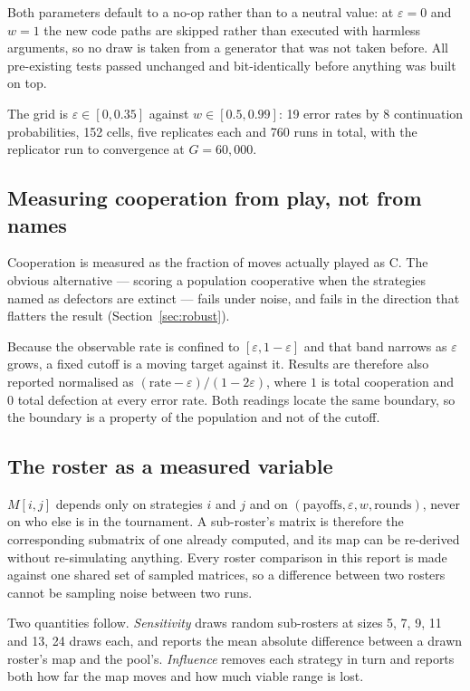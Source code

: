 \documentclass[11pt,a4paper]{article}
\newcommand{\eps}{\varepsilon}
\begin{document}
Both parameters default to a no-op rather than to a neutral value: at $\eps = 0$
and $w = 1$ the new code paths are skipped rather than executed with harmless
arguments, so no draw is taken from a generator that was not taken before. All
pre-existing tests passed unchanged and bit-identically before anything was
built on top.

The grid is $\eps \in [0, 0.35]$ against $w \in [0.5, 0.99]$: 19 error rates by
8 continuation probabilities, 152 cells, five replicates each and 760 runs in
total, with the replicator run to convergence at $G = 60{,}000$.

\subsection{Measuring cooperation from play, not from names}
\label{sec:metric}

Cooperation is measured as the fraction of moves actually played as \textsf{C}.
The obvious alternative --- scoring a population cooperative when the strategies
named as defectors are extinct --- fails under noise, and fails in the direction
that flatters the result (Section~\ref{sec:robust}).

Because the observable rate is confined to $[\eps, 1-\eps]$ and that band
narrows as $\eps$ grows, a fixed cutoff is a moving target against it. Results
are therefore also reported normalised as $(\text{rate}-\eps)/(1-2\eps)$, where
$1$ is total cooperation and $0$ total defection at every error rate. Both
readings locate the same boundary, so the boundary is a property of the
population and not of the cutoff.

\subsection{The roster as a measured variable}
\label{sec:roster-method}

$M[i,j]$ depends only on strategies $i$ and $j$ and on
$(\text{payoffs}, \eps, w, \text{rounds})$, never on who else is in the
tournament. A sub-roster's matrix is therefore the corresponding submatrix of
one already computed, and its map can be re-derived without re-simulating
anything. Every roster comparison in this report is made against one shared set
of sampled matrices, so a difference between two rosters cannot be sampling
noise between two runs.

Two quantities follow. \emph{Sensitivity} draws random sub-rosters at sizes 5,
7, 9, 11 and 13, 24 draws each, and reports the mean absolute difference between
a drawn roster's map and the pool's. \emph{Influence} removes each strategy in
turn and reports both how far the map moves and how much viable range is lost.
\end{document}
